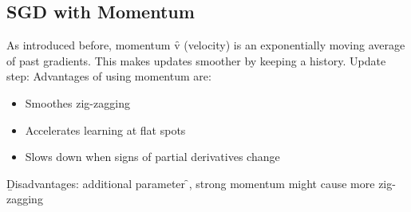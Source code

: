 \subsection{SGD with Momentum}
As introduced before, momentum \f{v} (velocity) is an exponentially moving average of past gradients. This makes updates smoother by keeping a history. Update step:
Advantages of using momentum are:
\begin{itemize}
    \item Smoothes zig-zagging
    \item Accelerates learning at flat spots
    \item Slows down when signs of partial derivatives change
\end{itemize}
\b{Disadvantages}: additional parameter \f{\beta}, strong momentum might cause more zig-zagging

